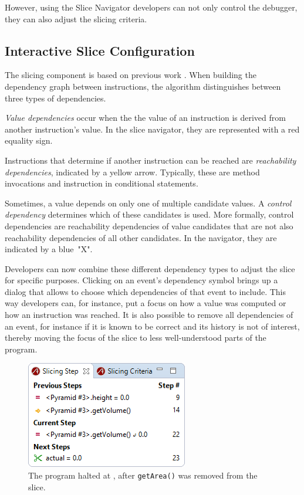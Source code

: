 ﻿\documentclass[
      english,
			conference,
      ]{IEEEtran}
\begin{document}
However, using the Slice Navigator developers can not only control the debugger, they can also adjust the slicing criteria.

\subsection{Interactive Slice Configuration}

The slicing component is based on previous work \cite{treffer_dynamic_2014}.
When building the dependency graph between instructions, the algorithm distinguishes between three types of dependencies.

\emph{Value dependencies} occur when the the value of an instruction is derived from another instruction's value.
In the slice navigator, they are represented with a red equality sign.

Instructions that determine if another instruction can be reached are \emph{reachability dependencies}, indicated by a yellow arrow.
Typically, these are method invocations and instruction in conditional statements.

Sometimes, a value depends on only one of multiple candidate values. 
A \emph{control dependency} determines which of these candidates is used.
More formally, control dependencies are reachability dependencies of value candidates that are not also reachability dependencies of all other candidates.
In the navigator, they are indicated by a blue~"X".

Developers can now combine these different dependency types to adjust the slice for specific purposes.
Clicking on an event's dependency symbol brings up a dialog that allows to choose which dependencies of that event to include.
This way developers can, for instance, put a focus on how a value was computed or how an instruction was reached.
It is also possible to remove all dependencies of an event, for instance if it is known to be correct and its history is not of interest, thereby moving the focus of the slice to less well-understood parts of the program.

\begin{figure}
	\centering
		\includegraphics[width=0.80\linewidth]{slice2.png}
	\caption{The program halted at , after \lstinline{getArea()} was removed from the slice.}
	\label{fig:slice2}
\end{figure}
\end{document}
